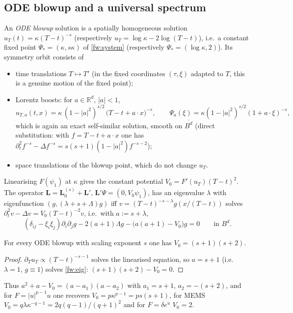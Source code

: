 \subsection{ODE blowup and a universal spectrum}
\label{fw:subsec-ode}
An \emph{ODE blowup} solution is a spatially homogeneous solution
$u_T(t)=\kappa(T-t)^{-s}$ (respectively $u_T=\log\kappa-2\log(T-t)$), i.e.\ a
constant fixed point $\Psi_*=(\kappa,s\kappa)$ of \eqref{fw:system}
(respectively $\Psi_*=(\log\kappa,2)$). Its
symmetry orbit consists of
\begin{itemize}[nosep]
\item time translations $T\mapsto T'$ (in the fixed coordinates $(\tau,\xi)$
  adapted to $T$, this is a genuine motion of the fixed point);
\item Lorentz boosts: for $a\in\mathbb R^d$, $|a|<1$,
  \begin{equation}\label{fw:boost}
  u_{T,a}(t,x)=\kappa\,(1-|a|^2)^{s/2}\,\big(T-t+a\cdot x\big)^{-s},\qquad
  \Psi_a(\xi)=\kappa(1-|a|^2)^{s/2}(1+a\cdot\xi)^{-s},
  \end{equation}
  which is again an exact self-similar solution, smooth on
  $\overline{B^d}$ (direct substitution: with $f=T-t+a\cdot x$ one has
  $\partial_t^2f^{-s}-\Delta f^{-s}=s(s+1)(1-|a|^2)f^{-s-2}$);
\item space translations of the blowup point, which do not change $u_T$.
\end{itemize}
Linearising $F(\psi_1)$ at $\kappa$ gives the constant potential
$V_0=F'(u_T)(T-t)^2$. The operator $\mathbf L=\mathbf
L_0^{(s)}+\mathbf L'$, $\mathbf L'\Psi=(0,V_0\psi_1)$, has an eigenvalue
$\lambda$ with eigenfunction $(g,(\lambda+s+\Lambda)g)$ iff
$v=(T-t)^{-s-\lambda}g(x/(T-t))$ solves $\partial_t^2v-\Delta v=V_0(T-t)^{-2}v$,
i.e.\ with $a:=s+\lambda$,
\begin{equation}\label{fw:eig}
  (\delta_{ij}-\xi_i\xi_j)\partial_i\partial_jg-2(a+1)\Lambda g-\big(a(a+1)-V_0\big)g=0\qquad\text{in }B^d.
\end{equation}

\begin{lemma}\label{fw:lem-V0}
For every ODE blowup with scaling exponent $s$ one has $V_0=(s+1)(s+2)$.
\end{lemma}
\begin{proof}
$\partial_Tu_T\propto (T-t)^{-s-1}$ solves the linearised equation, so
$a=s+1$ (i.e.\ $\lambda=1$, $g\equiv1$) solves \eqref{fw:eig}:
$(s+1)(s+2)-V_0=0$.
\end{proof}
Thus $a^2+a-V_0=(a-a_1)(a-a_2)$ with $a_1=s+1$, $a_2=-(s+2)$, and for
$F=|u|^{p-1}u$ one recovers $V_0=p\kappa^{p-1}=ps(s+1)$, for MEMS
$V_0=q\lambda\kappa^{-q-1}=2q(q-1)/(q+1)^2$ and for $F=\delta e^u$ $V_0=2$.

